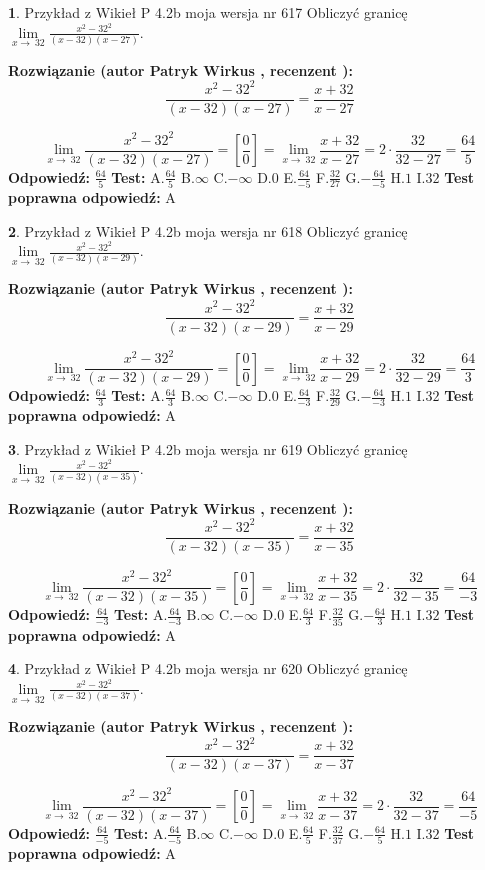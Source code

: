 \documentclass[12pt, a4paper]{article}
\theoremstyle{definition} %
\newtheorem{zad}{}
\newcommand{\zadStart}[1]{\begin{zad}#1\newline}
\newcommand{\zadStop}{\end{zad}}
\newcommand{\rozwStart}[2]{\noindent \textbf{Rozwiązanie (autor #1 , recenzent #2): }\newline}
\newcommand{\rozwStop}{\newline}
\newcommand{\odpStart}{\noindent \textbf{Odpowiedź:}\newline}
\newcommand{\odpStop}{\newline}
\newcommand{\testStart}{\noindent \textbf{Test:}\newline}
\newcommand{\testStop}{\newline}
\newcommand{\kluczStart}{\noindent \textbf{Test poprawna odpowiedź:}\newline}
\newcommand{\kluczStop}{\newline}
\begin{document}
\zadStart{Przykład z Wikieł P 4.2b moja wersja nr 617}
Obliczyć granicę $\lim\limits_{x\to\ 32}\frac{x^{2}-32^{2}}{(x-32)(x-27)}$.
\zadStop
\rozwStart{Patryk Wirkus}{}
$$\frac{x^{2}-32^{2}}{(x-32)(x-27)}=\frac{x+32}{x-27}$$

$$\lim\limits_{x\to\ 32}\frac{x^{2}-32^{2}}{(x-32)(x-27)}=[\frac{0}{0}]=\lim\limits_{x\to\ 32}\frac{x+32}{x-27}=2 \cdot \frac{32}{32-27} = \frac{64}{5}$$
\rozwStop
\odpStart
$\frac{64}{5}$
\odpStop
\testStart
A.$\frac{64}{5}$
B.$\infty$
C.$-\infty$
D.$0$
E.$\frac{64}{-5}$
F.$\frac{32}{27}$
G.$-\frac{64}{-5}$
H.$1$
I.$32$
\testStop
\kluczStart
A
\kluczStop



\zadStart{Przykład z Wikieł P 4.2b moja wersja nr 618}
Obliczyć granicę $\lim\limits_{x\to\ 32}\frac{x^{2}-32^{2}}{(x-32)(x-29)}$.
\zadStop
\rozwStart{Patryk Wirkus}{}
$$\frac{x^{2}-32^{2}}{(x-32)(x-29)}=\frac{x+32}{x-29}$$

$$\lim\limits_{x\to\ 32}\frac{x^{2}-32^{2}}{(x-32)(x-29)}=[\frac{0}{0}]=\lim\limits_{x\to\ 32}\frac{x+32}{x-29}=2 \cdot \frac{32}{32-29} = \frac{64}{3}$$
\rozwStop
\odpStart
$\frac{64}{3}$
\odpStop
\testStart
A.$\frac{64}{3}$
B.$\infty$
C.$-\infty$
D.$0$
E.$\frac{64}{-3}$
F.$\frac{32}{29}$
G.$-\frac{64}{-3}$
H.$1$
I.$32$
\testStop
\kluczStart
A
\kluczStop



\zadStart{Przykład z Wikieł P 4.2b moja wersja nr 619}
Obliczyć granicę $\lim\limits_{x\to\ 32}\frac{x^{2}-32^{2}}{(x-32)(x-35)}$.
\zadStop
\rozwStart{Patryk Wirkus}{}
$$\frac{x^{2}-32^{2}}{(x-32)(x-35)}=\frac{x+32}{x-35}$$

$$\lim\limits_{x\to\ 32}\frac{x^{2}-32^{2}}{(x-32)(x-35)}=[\frac{0}{0}]=\lim\limits_{x\to\ 32}\frac{x+32}{x-35}=2 \cdot \frac{32}{32-35} = \frac{64}{-3}$$
\rozwStop
\odpStart
$\frac{64}{-3}$
\odpStop
\testStart
A.$\frac{64}{-3}$
B.$\infty$
C.$-\infty$
D.$0$
E.$\frac{64}{3}$
F.$\frac{32}{35}$
G.$-\frac{64}{3}$
H.$1$
I.$32$
\testStop
\kluczStart
A
\kluczStop



\zadStart{Przykład z Wikieł P 4.2b moja wersja nr 620}
Obliczyć granicę $\lim\limits_{x\to\ 32}\frac{x^{2}-32^{2}}{(x-32)(x-37)}$.
\zadStop
\rozwStart{Patryk Wirkus}{}
$$\frac{x^{2}-32^{2}}{(x-32)(x-37)}=\frac{x+32}{x-37}$$

$$\lim\limits_{x\to\ 32}\frac{x^{2}-32^{2}}{(x-32)(x-37)}=[\frac{0}{0}]=\lim\limits_{x\to\ 32}\frac{x+32}{x-37}=2 \cdot \frac{32}{32-37} = \frac{64}{-5}$$
\rozwStop
\odpStart
$\frac{64}{-5}$
\odpStop
\testStart
A.$\frac{64}{-5}$
B.$\infty$
C.$-\infty$
D.$0$
E.$\frac{64}{5}$
F.$\frac{32}{37}$
G.$-\frac{64}{5}$
H.$1$
I.$32$
\testStop
\kluczStart
A
\kluczStop
\end{document}
